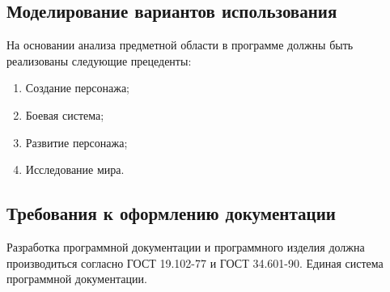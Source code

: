 \subsection{ Моделирование вариантов использования}
На основании анализа предметной области в программе должны быть реализованы следующие прецеденты:
\begin{enumerate}
\item Создание персонажа;
\item Боевая система;
\item Развитие персонажа;
\item Исследование мира.
\end{enumerate}

\subsection{Требования к оформлению документации}

Разработка программной документации и программного изделия должна производиться согласно ГОСТ 19.102-77 и ГОСТ 34.601-90. Единая система программной документации.
